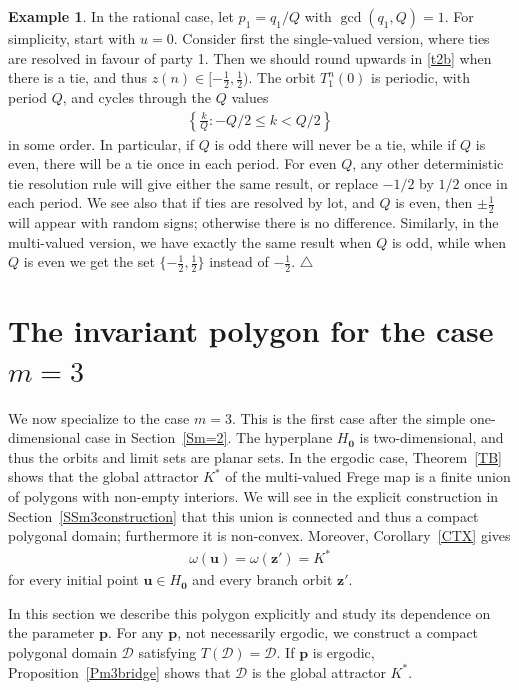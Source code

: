 \documentclass[11pt,reqno,tbtags,a4paper]{amsart}
\numberwithin{equation}{section}
\renewcommand\le{\leq}
\renewcommand\leq{\leqslant}
\theoremstyle{plain}%
\theoremstyle{definition}
\newcommand\xqed[1]{%
    \leavevmode\unskip\penalty9999 \hbox{}\nobreak\hfill
    \quad\hbox{#1}}
\newtheorem{exampleqqq}[theorem]{Example}
\newenvironment{example}{\begin{exampleqqq}}
  {\xqed{$\triangle$}\end{exampleqqq}}
\theoremstyle{remark}
\newcommand{\refT}[1]{Theorem~\ref{#1}}
\newcommand{\refC}[1]{Corollary~\ref{#1}}
\newcommand{\refS}[1]{Section~\ref{#1}}
\newcommand{\refSS}[1]{Section~\ref{#1}}
\newcommand\set[1]{\ensuremath{\{#1\}}}
\newcommand\lrset[1]{\ensuremath{\left\{#1\right\}}}
\newcommand\cD{\mathcal D}
\newcommand\cL{{\omega}}
\newcommand\Ho{H_{\0}}
\newcommand\vp{\mathbf{p}}
\newcommand\vu{\mathbf{u}}
\newcommand\vz{\mathbf{z}}
\newcommand\Kx{K^*}
\newcommand\0{{\boldsymbol 0}}
\newcommand\1{{\boldsymbol 1}}
\begin{document}
\begin{example}\label{Em=2Q}
  In the rational case, let $p_1=q_1/Q$ with $\gcd(q_1,Q)=1$.
For simplicity, start with $u=0$.
Consider first the single-valued version, where ties are resolved in favour
of party 1. Then we should round upwards in \eqref{t2b} when there is a tie,
and thus $z(n)\in[-\frac12,\frac12)$. The orbit $T_1^n(0)$ is periodic, with
period $Q$, and cycles through the $Q$ values
\begin{align}\label{em=2q}
  \lrset{\frac{k}{Q}: -Q/2 \le k< Q/2}
\end{align}
in some order. In particular, if $Q$ is odd there will never be a tie, while
if $Q$ is even, there will be a tie once in each period.
For even $Q$, 
any other deterministic tie resolution rule will give either the same
result, or replace $-1/2$ by $1/2$ once in each period.
We see also that if ties are resolved by lot, and $Q$ is even, 
then $\pm\frac12$ will appear with random signs; otherwise there is no
difference.
Similarly,
in the multi-valued version, we have exactly the same result when $Q$
is odd, while when $Q$ is even we get the set $\set{-\frac12,\frac12}$
instead of $-\frac12$. 
\end{example}




\section{The invariant polygon for the case $m=3$}\label{Sm=3}

We now specialize to the case $m=3$.
This is the first case after the simple one-dimensional case in \refS{Sm=2}.
The hyperplane $\Ho$ is two-dimensional, and thus
the orbits and limit sets are planar sets.  
In the
ergodic case, \refT{TB}
%
shows that the global attractor $\Kx$ of the multi-valued Frege map is a finite
union of polygons with non-empty interiors.  
We will see in the explicit construction
in \refSS{SSm3construction} that this union is connected and thus
a compact polygonal domain; furthermore it is non-convex.
%
Moreover, \refC{CTX} gives
\begin{align}
\cL(\vu)=\omega(\vz')=\Kx
\end{align}
for every initial point $\vu\in\Ho$ and every branch orbit $\vz'$.

In this section we describe this polygon explicitly and study its dependence
on the parameter $\vp$.  For any $\vp$, not necessarily ergodic, we construct
a compact polygonal domain $\cD$ satisfying $T(\cD)=\cD$.  If $\vp$ is
ergodic, Proposition~\ref{Pm3bridge} shows that $\cD$ is the global attractor
$\Kx$.
\end{document}
